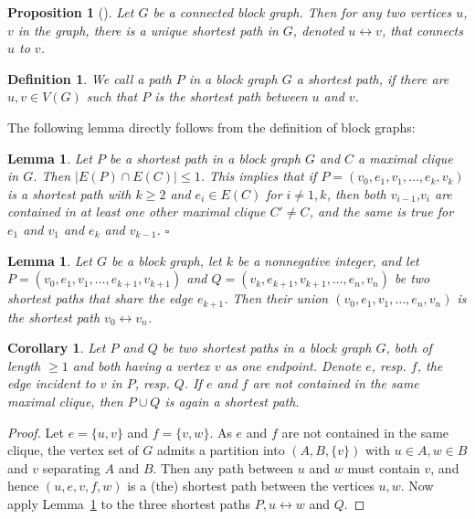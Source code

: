 \documentclass[a4paper, 11pt]{amsart}
\numberwithin{theorem}{section}
\newtheorem{definition}[theorem]{Definition}
\newtheorem{lemma}[theorem]{Lemma}
\newtheorem{proposition}[theorem]{Proposition}
\newtheorem{corollary}[theorem]{Corollary}
\begin{document}
\begin{proposition}[{\cite[Proposition~2]{MS21}}]
    Let $G$ be a connected block graph. Then for any two vertices $u$, $v$ in the graph, there is a unique shortest path in $G$, denoted $u \leftrightarrow v$, that connects $u$ to $v$.
\end{proposition}

\begin{definition}
    We call a path $P$ in a block graph $G$ a \emph{shortest path}, if there are $u,v\in V(G)$ such that $P$ is the shortest path between $u$ and $v$.
\end{definition}

The following lemma directly follows from the definition of block graphs:
\begin{lemma}\label{lemma:path-clique-edge}
    Let $P$ be a shortest path in a block graph $G$ and $C$ a maximal
    clique in $G$. Then $|E(P)\cap E(C)| \leq 1$. This implies that if
    $P = (v_0, e_1, v_1, \ldots , e_{k}, v_k)$ is a shortest path with
    $k \geq 2$ and $e_i \in E(C)$ for $i \neq 1,k$, then both
    $v_{i-1}$,$v_{i}$ are contained in at least one other maximal
    clique $C' \neq C$, and the same is true for $e_1$ and $v_1$ and
    $e_k$ and $v_{k-1}$. \hfill $\square$
\end{lemma}

\begin{lemma}{\cite[Lemma~4.4]{CMMPS23}}
\label{lemma:glueing_shortest_paths_same_edge}
    Let $G$ be a block graph, let $k$ be a nonnegative integer, and let $P = (v_0,e_1,v_1,
    \ldots, e_{k+1},v_{k+1})$ and $Q = (v_k,e_{k+1},v_{k+1}, \ldots, e_n,v_n)$ be two shortest paths that share the edge $e_{k+1}$. Then their union $(v_0,e_1,v_1,\ldots ,e_n,v_n)$ is the shortest path $v_0 \leftrightarrow v_n$.
\end{lemma}
\begin{corollary}
\label{Cor:shortest-path-criterion}
    Let $P$ and $Q$ be two shortest paths in a block graph $G$, both
    of length $\geq 1$ and both having a vertex $v$ as one endpoint. Denote $e$, resp. $f$, the edge incident to $v$ in $P$, resp. $Q$. If $e$ and $f$ are not contained in the same maximal clique, then $P\cup Q$ is again a shortest path.
\end{corollary}
\begin{proof}
    Let $e = \{u,v\}$ and $f= \{v,w\}$. As $e$ and $f$ are not
    contained in the same clique, the vertex set of $G$ admits a
    partition into $(A,B,\{v\})$ with $u \in A, w \in B$ and $v$
    separating $A$ and $B$. Then any path between $u$ and $w$ must
    contain $v$, and hence $(u,e,v,f,w)$ is a (the) shortest path
    between the vertices $u,w$. Now apply Lemma~\ref{lemma:glueing_shortest_paths_same_edge} to the three shortest paths $P, u\leftrightarrow w$ and $Q$.
\end{proof}
\end{document}
